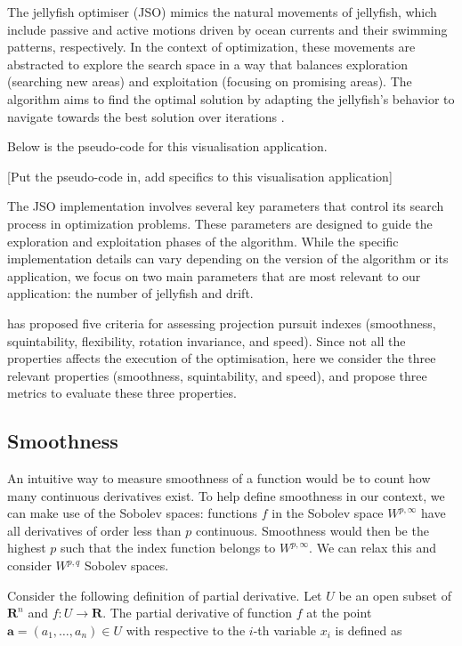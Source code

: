 \documentclass[
  number,
  preprint,
  3p]{elsarticle}
\begin{document}
The jellyfish optimiser (JSO) mimics the natural movements of jellyfish,
which include passive and active motions driven by ocean currents and
their swimming patterns, respectively. In the context of optimization,
these movements are abstracted to explore the search space in a way that
balances exploration (searching new areas) and exploitation (focusing on
promising areas). The algorithm aims to find the optimal solution by
adapting the jellyfish's behavior to navigate towards the best solution
over iterations \citep{chou_novel_2021}.

Below is the pseudo-code for this visualisation application.

{[}Put the pseudo-code in, add specifics to this visualisation
application{]}

The JSO implementation involves several key parameters that control its
search process in optimization problems. These parameters are designed
to guide the exploration and exploitation phases of the algorithm. While
the specific implementation details can vary depending on the version of
the algorithm or its application, we focus on two main parameters that
are most relevant to our application: the number of jellyfish and drift.

\citet{laa_using_2020} has proposed five criteria for assessing
projection pursuit indexes (smoothness, squintability, flexibility,
rotation invariance, and speed). Since not all the properties affects
the execution of the optimisation, here we consider the three relevant
properties (smoothness, squintability, and speed), and propose three
metrics to evaluate these three properties.

\subsection{Smoothness}\label{smoothness}

An intuitive way to measure smoothness of a function would be to count
how many continuous derivatives exist. To help define smoothness in our
context, we can make use of the Sobolev spaces: functions \(f\) in the
Sobolev space \(W^{p,\infty}\) have all derivatives of order less than
\(p\) continuous. Smoothness would then be the highest \(p\) such that
the index function belongs to \(W^{p,\infty}\). We can relax this and
consider \(W^{p,q}\) Sobolev spaces.

Consider the following definition of partial derivative. Let \(U\) be an
open subset of \(\mathbf{R}^n\) and \(f: U \rightarrow \mathbf{R}\). The
partial derivative of function \(f\) at the point
\(\mathbf{a} = (a_1, \ldots, a_n) \in U\) with respective to the
\(i\)-th variable \(x_i\) is defined as
\end{document}
